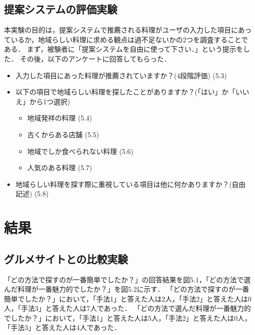 \documentclass{funthesis}
\begin{document}
\subsection{提案システムの評価実験}
本実験の目的は，提案システムで推薦される料理がユーザの入力した項目にあっているか，地域らしい料理に求める観点は過不足ないかの2つを調査することである．
まず，被験者に「提案システムを自由に使って下さい．」という提示をした．
その後，以下のアンケートに回答してもらった．

\begin{itemize}
 \item 入力した項目にあった料理が推薦されていますか？(4段階評価)   (5.3)
 \item 以下の項目で地域らしい料理を探したことがありますか？(「はい」か「いいえ」から1つ選択)
 \begin{itemize}
 \item 地域発祥の料理   (5.4)
  \item 古くからある店舗   (5.5)
   \item 地域でしか食べられない料理   (5.6)
    \item 人気のある料理   (5.7)
  \end{itemize}
 \item 地域らしい料理を探す際に重視している項目は他に何かありますか？(自由記述)   (5.8)
 \end{itemize}

\section{結果}
\subsection{グルメサイトとの比較実験}
「どの方法で探すのが一番簡単でしたか？」の回答結果を図5.1，「どの方法で選んだ料理が一番魅力的でしたか？」を図5.2に示す．
「どの方法で探すのが一番簡単でしたか？」において，「手法1」と答えた人は2人，「手法2」と答えた人は0人，「手法3」と答えた人は7人であった．
「どの方法で選んだ料理が一番魅力的でしたか？」において，「手法1」と答えた人は5人，「手法2」と答えた人は0人，「手法3」と答えた人は4人であった．
\end{document}
